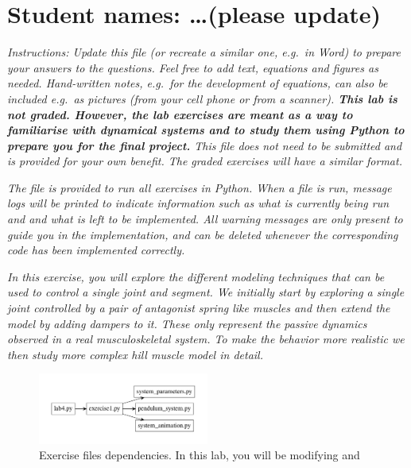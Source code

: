 \documentclass{cmc}
\begin{document}
\pagestyle{fancy}
 

\section*{Student names: \ldots (please update)}
\textit{Instructions: Update this file (or recreate a similar one,
  e.g.\ in Word) to prepare your answers to the questions. Feel free
  to add text, equations and figures as needed. Hand-written notes,
  e.g.\ for the development of equations, can also be included e.g.\
  as pictures (from your cell phone or from a scanner).  \textbf{This
    lab is not graded. However, the lab exercises are meant as a way
    to familiarise with dynamical systems and to study them using
    Python to prepare you for the final project.} This file does not
  need to be submitted and is provided for your own benefit. The
  graded exercises will have a similar format.}

\textit{The file  is provided to run all exercises
  in Python.
  When a file is run, message logs will be printed to indicate
  information such as what is currently being run and and what is left
  to be implemented. All warning messages are only present to guide
  you in the implementation, and can be deleted whenever the
  corresponding code has been implemented correctly.}


\textit{In this exercise, you will explore the different modeling
  techniques that can be used to control a single joint and
  segment. We initially start by exploring a single joint controlled
  by a pair of antagonist spring like muscles and then extend the
  model by adding dampers to it. These only represent the passive
  dynamics observed in a real musculoskeletal system. To make the
  behavior more realistic we then study more complex hill muscle model
  in detail. }

\begin{figure}[ht]
  \centering \includegraphics[width=0.5\textwidth]{figures/files}
  \caption{\label{fig:files} Exercise files dependencies. In this lab, you will
    be modifying \fileref{exercise1.py} and \fileref{pendulum\_system.py}}
\end{figure}
\end{document}
